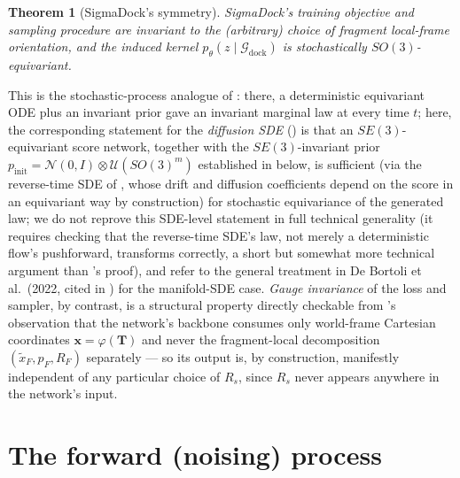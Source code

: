 \documentclass[11pt,a4paper]{report}
\newtheorem{theorem}{Theorem}[chapter]
\theoremstyle{definition}
\theoremstyle{remark}
\begin{document}
\begin{theorem}[SigmaDock's symmetry]
\label{thm:sigmadock-symmetry}
SigmaDock's training objective and sampling procedure are invariant to the
(arbitrary) choice of fragment local-frame orientation, and the induced
kernel $p_\theta(z\mid\mathcal G_{\mathrm{dock}})$ is stochastically
$SO(3)$-equivariant.
\end{theorem}

This is the stochastic-process analogue of
: there, a deterministic
equivariant ODE plus an invariant prior gave an invariant marginal law at
every time $t$; here, the corresponding statement for the \emph{diffusion
SDE} () is that an $SE(3)$-equivariant
score network, together with the $SE(3)$-invariant prior
$p_{\mathrm{init}}=\mathcal N(0,I)\otimes\mathcal U(SO(3)^m)$ established in
 below, is sufficient (via the reverse-time SDE
of , whose drift and
diffusion coefficients depend on the score in an equivariant way by
construction) for stochastic equivariance of the generated law; we do not
reprove this SDE-level statement in full technical generality (it requires
checking that the reverse-time SDE's law, not merely a deterministic flow's
pushforward, transforms correctly, a short but somewhat more technical
argument than 's proof), and refer
to the general treatment in De Bortoli et al.\ (2022, cited in
) for the manifold-SDE case.
\emph{Gauge invariance} of the loss and sampler, by contrast, is a
structural property directly checkable from
's observation that the network's backbone
consumes only world-frame Cartesian coordinates
$\mathbf x=\varphi(\mathbf T)$ and never the fragment-local decomposition
$(\tilde x_F,p_F,R_F)$ separately --- so its output is, by construction,
manifestly independent of any particular choice of $R_s$, since $R_s$ never
appears anywhere in the network's input.

\section{The forward (noising) process}
\label{sec:sigmadock-forward}
\end{document}
